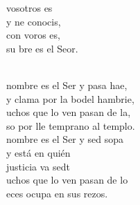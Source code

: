 \begin{cancion}%
	\begin{chorus}%
	 vosotros es \\
	y ne conocis,\\
	con voros es, \\
	su bre es el Seor.\\
	\end{chorus}%
	\jump\\
	nombre es el Ser y pasa hae,\\
	y clama por la bodel hambrie,\\
	uchos que lo ven pasan de la,\\
	so por lle temprano al templo.\\
	nombre es el Ser y sed sopa\\
y está en quién \\
	justicia va sedt\\
	uchos que lo ven pasan de lo\\
	eces ocupa en sus rezos.\\
\end{cancion}%
